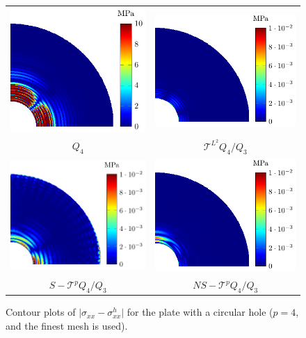 \begin{figure}[htb!]
    \center
    \begin{tabular}{cc}
        \includegraphics[width=.44\linewidth]{no} & \includegraphics[width=.5\linewidth]{g}  \\
        $Q_4$                                     & $\mathcal{T}^{L^2} Q_4/Q_3$              \\
        \includegraphics[width=.5\linewidth]{s}   & \includegraphics[width=.5\linewidth]{ns} \\
        $S-\mathcal{T}^{p} Q_4/Q_3$               & $NS-\mathcal{T}^{p} Q_4/Q_3$
    \end{tabular}
    \caption{Contour plots of $\vert{\sigma_{xx}-\sigma_{xx}^h}\vert$ for the plate with a circular hole ($p=4$, and the finest mesh is used).}
    \label{fig:platewithhole_error_contour}
\end{figure}

